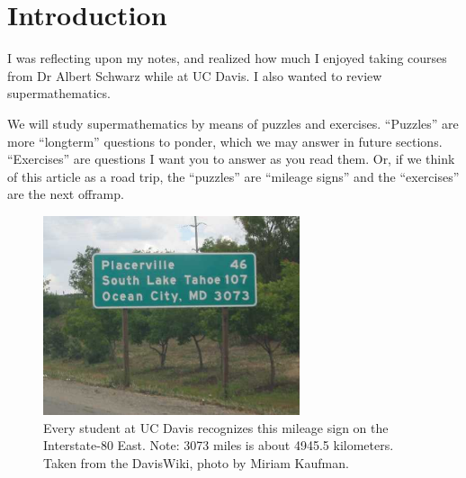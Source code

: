 \section{Introduction}

\M I was reflecting upon my notes, and realized how much I enjoyed
taking courses from Dr Albert Schwarz while at UC Davis. I also wanted
to review supermathematics.

\M
We will study supermathematics by means of puzzles and exercises.
``Puzzles'' are more ``longterm'' questions to ponder, which we may
answer in future sections. ``Exercises'' are questions I want you to
answer as you read them. Or, if we think of this article as a road
trip, the ``puzzles'' are ``mileage signs'' and the ``exercises'' are the
next offramp.

\begin{figure}[h]
  \centering
  \includegraphics[width=7.55cm]{img/ocean-city.JPG}
  \caption[Mileage sign]{Every student at UC Davis recognizes this mileage sign on the
    Interstate-80 East. Note: 3073 miles is about 4945.5 kilometers. Taken from the DavisWiki, photo by Miriam Kaufman.\footnotemark}
\end{figure}
